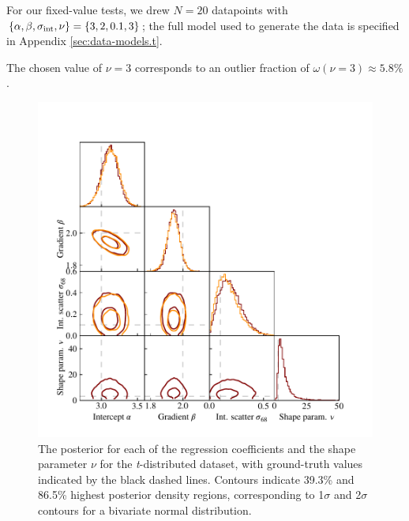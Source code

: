 \documentclass[fleqn,usenatbib]{mnras}
\begin{document}
For our fixed-value tests, we drew $N = 20$ datapoints with $\{\alpha, \beta,
\sigma_{\rm int}, \nu\} = \{3, 2, 0.1, 3\}$; the full model used to generate the
data is specified in Appendix \ref{sec:data-models.t}.


The chosen value of $\nu = 3$ corresponds to an outlier fraction of $\omega(\nu = 3)
\approx 5.8 \%$.


\begin{figure}
    \includegraphics[width=\columnwidth]{graphics/corner_t.pdf}
    \caption{The posterior for each of the regression coefficients and the shape
    parameter $\nu$ for the \textit{t}-distributed dataset, with ground-truth
    values indicated by the black dashed lines. Contours indicate 39.3\% and
    86.5\% highest posterior density regions, corresponding to 1$\sigma$ and
    2$\sigma$ contours for a bivariate normal distribution.}
    \label{fig:results.t.corner}
\end{figure}
\end{document}
